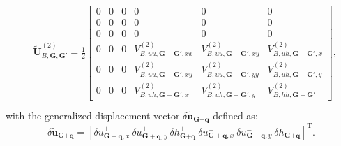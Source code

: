 \documentclass[aps,prx,10pt,twocolumn,superscriptaddress]{revtex4}
\begin{document}
\begin{widetext}
\allowdisplaybreaks
\begin{align}
\begin{split}
&\tilde{\textbf{U}}^{(2)}_{B,\textbf{G},\textbf{G}'}=\frac{1}{2}\left[\begin{array}{cccccc}
				0 &0&0&0&0&0 \\
				0 & 0&0&0&0&0 \\
				0&0&0&0&0&0\\
				0&0&0&V^{(2)}_{B,uu,\textbf{G}-\textbf{G}',xx} & V^{(2)}_{B,uu,\textbf{G}-\textbf{G}',xy}&V^{(2)}_{B,uh,\textbf{G}-\textbf{G}',x}\\
				0&0&0&V^{(2)}_{B,uu,\textbf{G}-\textbf{G}',xy} & V^{(2)}_{B,uu,\textbf{G}-\textbf{G}',yy}&V^{(2)}_{B,uh,\textbf{G}-\textbf{G}',y}\\
				0&0&0&V^{(2)}_{B,uh,\textbf{G}-\textbf{G}',x} & V^{(2)}_{B,uh,\textbf{G}-\textbf{G}',y}&V^{(2)}_{B,hh,\textbf{G}-\textbf{G}'}
\end{array}\right],\\
\end{split}
\end{align}
with the generalized displacement vector $\delta\tilde{\textbf{u}}_{\textbf{G}+\textbf{q}}$ defined as:
\begin{equation}
\delta\tilde{\textbf{u}}_{\textbf{G}+\textbf{q}}=[\delta u^{+}_{\textbf{G}+\textbf{q},x}\ \delta u^{+}_{\textbf{G}+\textbf{q},y}\ \delta h^{+}_{\textbf{G}+\textbf{q}}\ \delta u^{-}_{\textbf{G}+\textbf{q},x}\ \delta u^{-}_{\textbf{G}+\textbf{q},y}\ \delta h^{-}_{\textbf{G}+\textbf{q}} ]^{\mathrm{T}}.
\end{equation}


\end{widetext}
\end{document}
